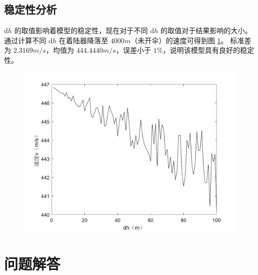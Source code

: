 \documentclass[hyperref,a4paper,UTF8]{ctexart}
\begin{document}
\subsection{稳定性分析}
$\mathrm{d}h$ 的取值影响着模型的稳定性，现在对于不同 $\mathrm{d}h$ 的取值对于结果影响的大小。
通过计算不同 $\mathrm{d}h$ 在着陆器降落至 $4000m$（未开伞）的速度可得到图 \ref{pic:sta}。
标准差为 $2.3169m/s$，均值为 $444.4440m/s$，误差小于 $1\%$，说明该模型具有良好的稳定性。
\begin{figure}[ht!]
    \centering
    \includegraphics[scale=0.5]{稳定性的图.pdf}
    \caption{}
    \label{pic:sta}
\end{figure}

\section{问题解答}
\end{document}
